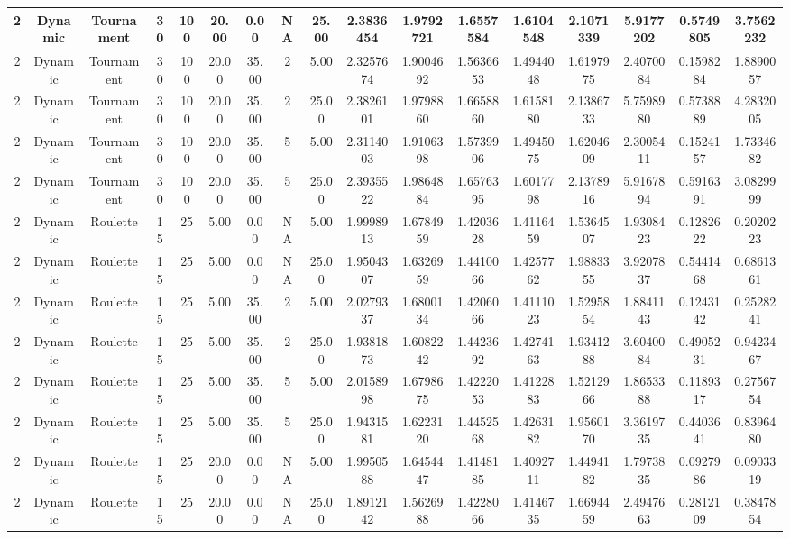 \documentclass[a4paper]{article}
\begin{document}
\begin{center}
\begin{tabular}{ | c | c | c | c | c | c | c | c | c | c | c | c | c | c | c | c | c | }
		\hline
		2	&	Dynamic	&	Tournament	&	30	&	100	&	20.00	&	0.00	&	NA	&	25.00	&	2.3836454	&	1.9792721	&	1.6557584	&	1.6104548	&	2.1071339	&	5.9177202	&	0.5749805	&	3.7562232 \\
		\hline
		2	&	Dynamic	&	Tournament	&	30	&	100	&	20.00	&	35.00	&	2	&	5.00	&	2.3257674	&	1.9004692	&	1.5636653	&	1.4944048	&	1.6197975	&	2.4070084	&	0.1598284	&	1.8890057 \\
		\hline
		2	&	Dynamic	&	Tournament	&	30	&	100	&	20.00	&	35.00	&	2	&	25.00	&	2.3826101	&	1.9798860	&	1.6658860	&	1.6158180	&	2.1386733	&	5.7598980	&	0.5738889	&	4.2832005 \\
		\hline
		2	&	Dynamic	&	Tournament	&	30	&	100	&	20.00	&	35.00	&	5	&	5.00	&	2.3114003	&	1.9106398	&	1.5739906	&	1.4945075	&	1.6204609	&	2.3005411	&	0.1524157	&	1.7334682 \\
		\hline
		2	&	Dynamic	&	Tournament	&	30	&	100	&	20.00	&	35.00	&	5	&	25.00	&	2.3935522	&	1.9864884	&	1.6576395	&	1.6017798	&	2.1378916	&	5.9167894	&	0.5916391	&	3.0829999 \\
		\hline
		2	&	Dynamic	&	Roulette	&	15	&	25	&	5.00	&	0.00	&	NA	&	5.00	&	1.9998913	&	1.6784959	&	1.4203628	&	1.4116459	&	1.5364507	&	1.9308423	&	0.1282622	&	0.2020223 \\
		\hline
		2	&	Dynamic	&	Roulette	&	15	&	25	&	5.00	&	0.00	&	NA	&	25.00	&	1.9504307	&	1.6326959	&	1.4410066	&	1.4257762	&	1.9883355	&	3.9207837	&	0.5441468	&	0.6861361 \\
		\hline
		2	&	Dynamic	&	Roulette	&	15	&	25	&	5.00	&	35.00	&	2	&	5.00	&	2.0279337	&	1.6800134	&	1.4206066	&	1.4111023	&	1.5295854	&	1.8841143	&	0.1243142	&	0.2528241 \\
		\hline
		2	&	Dynamic	&	Roulette	&	15	&	25	&	5.00	&	35.00	&	2	&	25.00	&	1.9381873	&	1.6082242	&	1.4423692	&	1.4274163	&	1.9341288	&	3.6040084	&	0.4905231	&	0.9423467 \\
		\hline
		2	&	Dynamic	&	Roulette	&	15	&	25	&	5.00	&	35.00	&	5	&	5.00	&	2.0158998	&	1.6798675	&	1.4222053	&	1.4122883	&	1.5212966	&	1.8653388	&	0.1189317	&	0.2756754 \\
		\hline
		2	&	Dynamic	&	Roulette	&	15	&	25	&	5.00	&	35.00	&	5	&	25.00	&	1.9431581	&	1.6223120	&	1.4452568	&	1.4263182	&	1.9560170	&	3.3619735	&	0.4403641	&	0.8396480 \\
		\hline
		2	&	Dynamic	&	Roulette	&	15	&	25	&	20.00	&	0.00	&	NA	&	5.00	&	1.9950588	&	1.6454447	&	1.4148185	&	1.4092711	&	1.4494182	&	1.7973835	&	0.0927986	&	0.0903319 \\
		\hline
		2	&	Dynamic	&	Roulette	&	15	&	25	&	20.00	&	0.00	&	NA	&	25.00	&	1.8912142	&	1.5626988	&	1.4228066	&	1.4146735	&	1.6694459	&	2.4947663	&	0.2812109	&	0.3847854 \\

\end{tabular}
\end{center}
\end{document}
